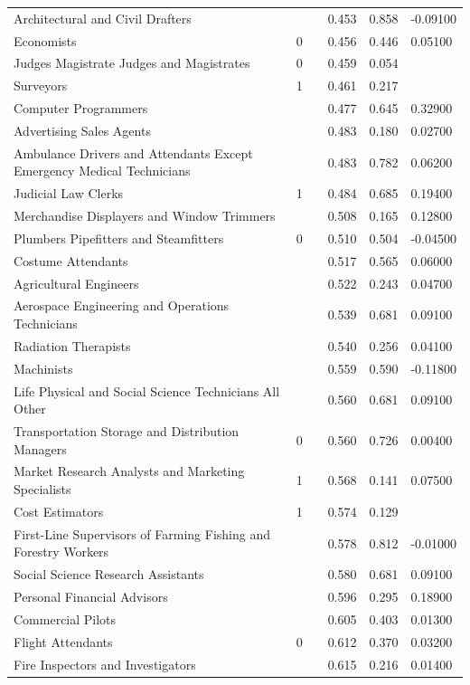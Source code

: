 \documentclass[11pt]{report}
\numberwithin{equation}{chapter}
\begin{document}
\begin{spacing}{2}
\begin{longtable}{ p{} p{} p{}  p{}  p{}  p{} }
Architectural and Civil Drafters	&		&	&	0.453	&	0.858	&	-0.09100	\\
Economists	&	0	&	&	0.456	&	0.446	&	0.05100	\\
Judges Magistrate Judges and Magistrates	&	0	&	&	0.459	&	0.054	&		\\
Surveyors	&	1	&	&	0.461	&	0.217	&		\\
Computer Programmers	&		&	&	0.477	&	0.645	&	0.32900	\\
Advertising Sales Agents	&		&	&	0.483	&	0.180	&	0.02700	\\
Ambulance Drivers and Attendants Except Emergency Medical Technicians	&		&	&	0.483	&	0.782	&	0.06200	\\
Judicial Law Clerks	&	1	&	&	0.484	&	0.685	&	0.19400	\\
Merchandise Displayers and Window Trimmers	&		&	&	0.508	&	0.165	&	0.12800	\\
Plumbers Pipefitters and Steamfitters	&	0	&	&	0.510	&	0.504	&	-0.04500	\\
Costume Attendants	&		&	&	0.517	&	0.565	&	0.06000	\\
Agricultural Engineers	&		&	&	0.522	&	0.243	&	0.04700	\\
Aerospace Engineering and Operations Technicians	&		&	&	0.539	&	0.681	&	0.09100	\\
Radiation Therapists	&		&	&	0.540	&	0.256	&	0.04100	\\
Machinists	&		&	&	0.559	&	0.590	&	-0.11800	\\
Life Physical and Social Science Technicians All Other	&		&	&	0.560	&	0.681	&	0.09100	\\
Transportation Storage and Distribution Managers	&	0	&	&	0.560	&	0.726	&	0.00400	\\
Market Research Analysts and Marketing Specialists	&	1	&	&	0.568	&	0.141	&	0.07500	\\
Cost Estimators	&	1	&	&	0.574	&	0.129	&		\\
First-Line Supervisors of Farming Fishing and Forestry Workers	&		&	&	0.578	&	0.812	&	-0.01000	\\
Social Science Research Assistants	&		&	&	0.580	&	0.681	&	0.09100	\\
Personal Financial Advisors	&		&	&	0.596	&	0.295	&	0.18900	\\
Commercial Pilots	&		&	&	0.605	&	0.403	&	0.01300	\\
Flight Attendants	&	0	&	&	0.612	&	0.370	&	0.03200	\\
Fire Inspectors and Investigators	&		&	&	0.615	&	0.216	&	0.01400	\\

\end{longtable}
\end{spacing}
\end{document}
